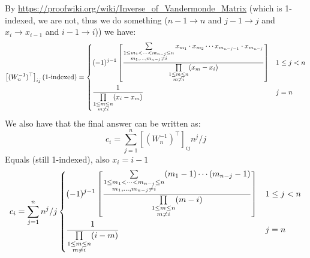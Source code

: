 \documentclass{book}
\begin{document}
By \url{https://proofwiki.org/wiki/Inverse_of_Vandermonde_Matrix} (which is 1-indexed, we are not, thus we do something ($n-1\to n$ and $j-1 \to j$ and $x_i \to x_{i-1}$ and $i-1 \to i$)) we have:
\begin{equation}
    \left[(W_n^{-1})^\top\right]_{ij} (\textrm{1-indexed}) = \begin{dcases}
        (-1)^{j-1} \left[ \frac{\sum\limits_{\substack{1\leq m_1 < \dots < m_{n-j} \leq n \\ m_1, \dots, m_{n-j} \neq i}} x_{m_1} \cdot x_{m_2} \cdots x_{m_{n-j-1}} \cdot x_{m_{n-j}}}{\prod\limits_{\substack{1\leq m \leq n \\ m \neq i}} (x_m - x_i)} \right] & 1 \leq j < n \\
        \frac{1}{\prod\limits_{\substack{1\leq m \leq n \\ m \neq i}} (x_i - x_m)} & j = n
    \end{dcases} \nonumber
\end{equation}
We also have that the final answer can be written as:
\begin{equation}
    c_i = \sum_{j=1}^{n} \left[(W_n^{-1})^\top\right]_{ij} n^{j}/j \nonumber
\end{equation}
Equals (still 1-indexed), also $x_i = i - 1$
\begin{equation}
    c_i = \sum_{j=1}^{n} n^{j}/j \begin{dcases}
        (-1)^{j-1} \left[ \frac{\sum\limits_{\substack{1\leq m_1 < \dots < m_{n-j} \leq n \\ m_1, \dots, m_{n-j} \neq i}} (m_1-1) \cdots (m_{n-j}-1)}{\prod\limits_{\substack{1\leq m \leq n \\ m \neq i}} (m - i)} \right] & 1 \leq j < n \\
        \frac{1}{\prod\limits_{\substack{1\leq m \leq n \\ m \neq i}} (i - m)} & j = n
    \end{dcases} \nonumber
\end{equation}
\end{document}
